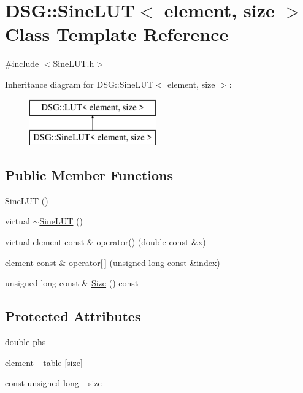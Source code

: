 \hypertarget{classDSG_1_1SineLUT}{\section{D\+S\+G\+:\+:Sine\+L\+U\+T$<$ element, size $>$ Class Template Reference}
\label{classDSG_1_1SineLUT}
}


{\ttfamily \#include $<$Sine\+L\+U\+T.\+h$>$}

Inheritance diagram for D\+S\+G\+:\+:Sine\+L\+U\+T$<$ element, size $>$\+:\begin{figure}[H]
\begin{center}
\leavevmode
\includegraphics[height=2.000000cm]{classDSG_1_1SineLUT}
\end{center}
\end{figure}
\subsection*{Public Member Functions}
\begin{DoxyCompactItemize}
\item 
\hyperlink{classDSG_1_1SineLUT_aaaaedbf1b278e69d232a9d9ad3100128}{Sine\+L\+U\+T} ()
\item 
virtual \hyperlink{classDSG_1_1SineLUT_a0acc0dcf9b64d28d14bda69c62739026}{$\sim$\+Sine\+L\+U\+T} ()
\item 
virtual element const \& \hyperlink{classDSG_1_1SineLUT_a1373f5663138855be2ea01999b6d6ac8}{operator()} (double const \&x)
\item 
element const \& \hyperlink{classDSG_1_1LUT_a5f3bc252bd650fae13046e7959b94f81}{operator\mbox{[}$\,$\mbox{]}} (unsigned long const \&index)
\item 
unsigned long const \& \hyperlink{classDSG_1_1LUT_a2d1a2112f9e960c7b70882a19d670ff9}{Size} () const 
\end{DoxyCompactItemize}
\subsection*{Protected Attributes}
\begin{DoxyCompactItemize}
\item 
double \hyperlink{classDSG_1_1SineLUT_ae780e53f58e2c7dc0568ee96f2d5598b}{phs}
\item 
element \hyperlink{classDSG_1_1LUT_ac8b23bbb7ce259d4ceb1c6fa93a7f29f}{\+\_\+table} \mbox{[}size\mbox{]}
\item 
const unsigned long \hyperlink{classDSG_1_1LUT_a87c352b5eaea2188955213c0f4ae9799}{\+\_\+size}
\end{DoxyCompactItemize}


